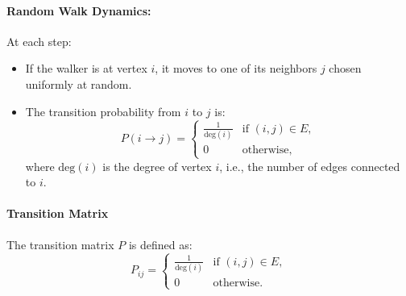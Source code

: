 \paragraph{Random Walk Dynamics:}
At each step:
\begin{itemize}
    \item If the walker is at vertex \( i \), it moves to one of its neighbors \( j \) chosen uniformly at random.
    \item The transition probability from \( i \) to \( j \) is:
    \[
    P(i \to j) =
    \begin{cases}
    \frac{1}{\text{deg}(i)} & \text{if } (i, j) \in E, \\
    0 & \text{otherwise},
    \end{cases}
    \]
    where \( \text{deg}(i) \) is the degree of vertex \( i \), i.e., the number of edges connected to \( i \).
\end{itemize}

\paragraph{Transition Matrix}
The transition matrix \( P \) is defined as:
\[
P_{ij} =
\begin{cases}
\frac{1}{\text{deg}(i)} & \text{if } (i, j) \in E, \\
0 & \text{otherwise}.
\end{cases}
\]

